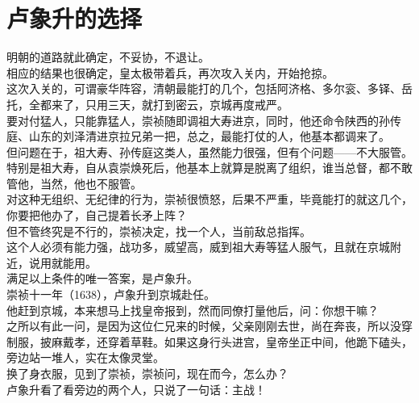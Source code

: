 \section{卢象升的选择}
\ifnum{}
	\begin{multicols}{\theparacolNo}
\fi
明朝的道路就此确定，不妥协，不退让。\\

相应的结果也很确定，皇太极带着兵，再次攻入关内，开始抢掠。\\

这次入关的，可谓豪华阵容，清朝最能打的几个，包括阿济格、多尔衮、多铎、岳托，全都来了，只用三天，就打到密云，京城再度戒严。\\

要对付猛人，只能靠猛人，崇祯随即调祖大寿进京，同时，他还命令陕西的孙传庭、山东的刘泽清进京拉兄弟一把，总之，最能打仗的人，他基本都调来了。\\

但问题在于，祖大寿、孙传庭这类人，虽然能力很强，但有个问题——不大服管。特别是祖大寿，自从袁崇焕死后，他基本上就算是脱离了组织，谁当总督，都不敢管他，当然，他也不服管。\\

对这种无组织、无纪律的行为，崇祯很愤怒，后果不严重，毕竟能打的就这几个，你要把他办了，自己提着长矛上阵？\\

但不管终究是不行的，崇祯决定，找一个人，当前敌总指挥。\\

这个人必须有能力强，战功多，威望高，威到祖大寿等猛人服气，且就在京城附近，说用就能用。\\

满足以上条件的唯一答案，是卢象升。\\

崇祯十一年（1638），卢象升到京城赴任。\\

他赶到京城，本来想马上找皇帝报到，然而同僚打量他后，问：你想干嘛？\\

之所以有此一问，是因为这位仁兄来的时候，父亲刚刚去世，尚在奔丧，所以没穿制服，披麻戴孝，还穿着草鞋。如果这身行头进宫，皇帝坐正中间，他跪下磕头，旁边站一堆人，实在太像灵堂。\\

换了身衣服，见到了崇祯，崇祯问，现在而今，怎么办？\\

卢象升看了看旁边的两个人，只说了一句话：主战！\\


\end{multicols}
